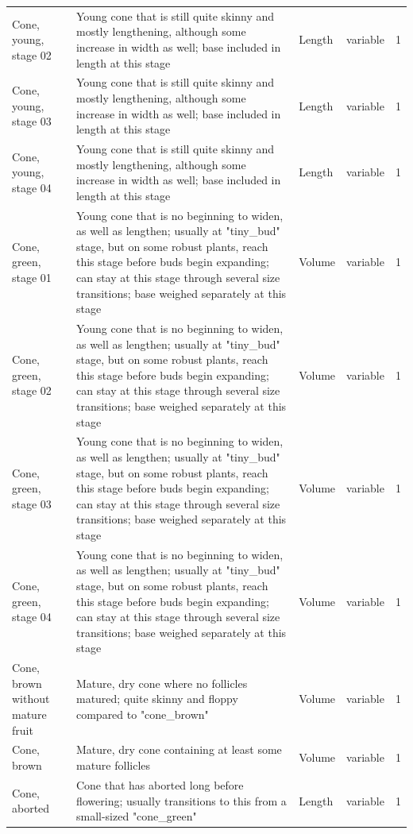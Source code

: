 \documentclass[10pt,twoside]{article}\usepackage[]{graphicx}\usepackage[]{color}
\begin{document}
\begin{longtable}{p{4.5cm}p{6cm}p{2cm}p{1cm}p{1cm}}
  Cone, young, stage 02 & Young cone that is still quite skinny and mostly lengthening, although some increase in width as well; base included in length at this stage & Length & variable &   1 \\ 
  Cone, young, stage 03 & Young cone that is still quite skinny and mostly lengthening, although some increase in width as well; base included in length at this stage & Length & variable &   1 \\ 
  Cone, young, stage 04 & Young cone that is still quite skinny and mostly lengthening, although some increase in width as well; base included in length at this stage & Length & variable &   1 \\ 
  Cone, green, stage 01 & Young cone that is no beginning to widen, as well as lengthen; usually at "tiny\_bud" stage, but on some robust plants, reach this stage before buds begin expanding; can stay at this stage through several size transitions; base weighed separately at this stage & Volume & variable &   1 \\ 
  Cone, green, stage 02 & Young cone that is no beginning to widen, as well as lengthen; usually at "tiny\_bud" stage, but on some robust plants, reach this stage before buds begin expanding; can stay at this stage through several size transitions; base weighed separately at this stage & Volume & variable &   1 \\ 
  Cone, green, stage 03 & Young cone that is no beginning to widen, as well as lengthen; usually at "tiny\_bud" stage, but on some robust plants, reach this stage before buds begin expanding; can stay at this stage through several size transitions; base weighed separately at this stage & Volume & variable &   1 \\ 
  Cone, green, stage 04 & Young cone that is no beginning to widen, as well as lengthen; usually at "tiny\_bud" stage, but on some robust plants, reach this stage before buds begin expanding; can stay at this stage through several size transitions; base weighed separately at this stage & Volume & variable &   1 \\ 
  Cone, brown without mature fruit & Mature, dry cone where no follicles matured; quite skinny and floppy compared to "cone\_brown" & Volume & variable &   1 \\ 
  Cone, brown & Mature, dry cone containing at least some mature follicles & Volume & variable &   1 \\ 
  Cone, aborted & Cone that has aborted long before flowering; usually transitions to this from a small-sized "cone\_green" & Length & variable &   1 \\ 

\end{longtable}
\end{document}
